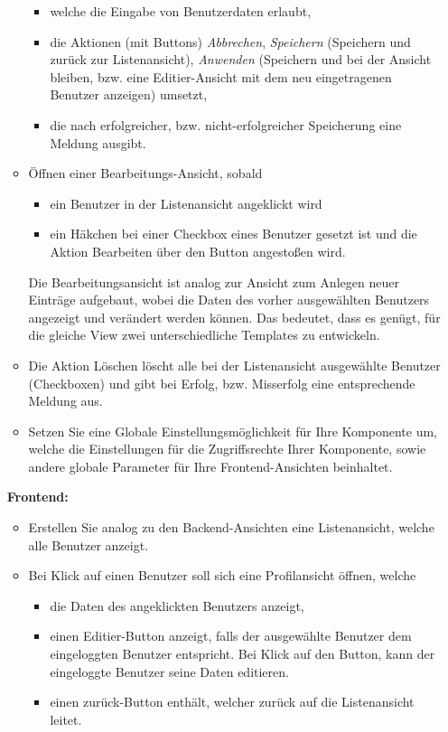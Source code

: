\documentclass[]{article}
\begin{document}
\begin{itemize}
\begin{itemize}
\begin{itemize}
			\item welche die Eingabe von Benutzerdaten erlaubt,
			\item die Aktionen (mit Buttons) \textit{Abbrechen}, \textit{Speichern} (Speichern und zurück zur Listenansicht), \textit{Anwenden} (Speichern und bei der Ansicht bleiben, bzw. eine Editier-Ansicht mit dem neu eingetragenen Benutzer anzeigen) umsetzt,
			\item die nach erfolgreicher, bzw. nicht-erfolgreicher Speicherung eine Meldung ausgibt.
		\end{itemize}
		\item Öffnen einer Bearbeitungs-Ansicht, sobald
		\begin{itemize}
			\item ein Benutzer in der Listenansicht angeklickt wird
			\item ein Häkchen bei einer Checkbox eines Benutzer gesetzt ist und die Aktion Bearbeiten über den Button angestoßen wird.  
		\end{itemize}
		Die Bearbeitungsansicht ist analog zur Ansicht zum Anlegen neuer Einträge aufgebaut, wobei die Daten des vorher ausgewählten Benutzers angezeigt und verändert werden können. Das bedeutet, dass es genügt, für die gleiche View zwei unterschiedliche Templates zu entwickeln.
		\item Die Aktion Löschen löscht alle bei der Listenansicht ausgewählte Benutzer (Checkboxen) und gibt bei Erfolg, bzw. Misserfolg eine entsprechende Meldung aus.
		\item Setzen Sie eine Globale Einstellungsmöglichkeit für Ihre Komponente um, welche die Einstellungen für die Zugriffsrechte Ihrer Komponente, sowie andere globale Parameter für Ihre Frontend-Ansichten beinhaltet.
	\end{itemize}
	\textbf{Frontend:} 
	\begin{itemize}
		\item Erstellen Sie analog zu den Backend-Ansichten eine Listenansicht, welche alle Benutzer anzeigt. 
		\item Bei Klick auf einen Benutzer soll sich eine Profilansicht öffnen, welche 
		\begin{itemize}
			\item die Daten des angeklickten Benutzers anzeigt,
			\item einen Editier-Button anzeigt, falls der ausgewählte Benutzer dem eingeloggten Benutzer entspricht. Bei Klick auf den Button, kann der eingeloggte Benutzer seine Daten editieren.
			\item einen zurück-Button enthält, welcher zurück auf die Listenansicht leitet.
		\end{itemize}
	\end{itemize}
\end{itemize}
\end{document}
